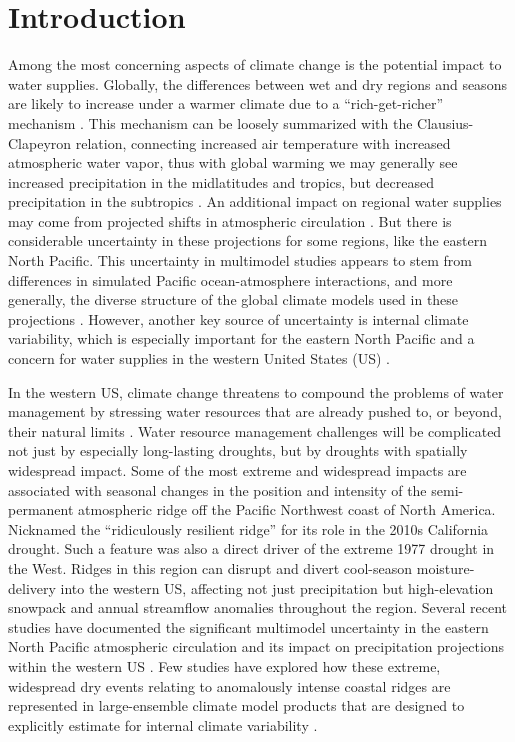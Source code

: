 \documentclass[final, double]{ua-thesis}
\begin{document}
\section{Introduction}


Among the most concerning aspects of climate change is the potential impact to water supplies. Globally, the differences between wet and dry regions and seasons are likely to increase under a warmer climate due to a ``rich-get-richer'' mechanism \citep{3ipcc_climate_2013}. This mechanism can be loosely summarized with the Clausius-Clapeyron relation, connecting increased air temperature with increased atmospheric water vapor, thus with global warming we may generally see increased precipitation in the midlatitudes and tropics, but decreased precipitation in the subtropics \citep{3manabe_effects_1975, 3held_robust_2006}. An additional impact on regional water supplies may come from projected shifts in atmospheric circulation \citep{3lu_expansion_2007, 3scheff_twenty-first-century_2012}. But there is considerable uncertainty in these projections for some regions, like the eastern North Pacific. This uncertainty in multimodel studies appears to stem from differences in simulated Pacific ocean-atmosphere interactions, and more generally, the diverse structure of the global climate models used in these projections \citep[e.g., ][]{3langenbrunner_patterns_2015, 3choi_uncertainty_2016, 3reclamation_bureau_of_reclamation_west-wide_2016}. However, another key source of uncertainty is internal climate variability, which is especially important for the eastern North Pacific and a concern for water supplies in the western United States (US) \citep{3reclamation_bureau_of_reclamation_west-wide_2016}.

In the western US, climate change threatens to compound the problems of water management by stressing water resources that are already pushed to, or beyond, their natural limits \citep{3dettinger_western_2015}. Water resource management challenges will be complicated not just by especially long-lasting droughts, but by droughts with spatially widespread impact. Some of the most extreme and widespread impacts are associated with seasonal changes in the position and intensity of the semi-permanent atmospheric ridge off the Pacific Northwest coast of North America. Nicknamed the ``ridiculously resilient ridge'' for its role in the 2010s California drought. Such a feature was also a direct driver of the extreme 1977 drought in the West. Ridges in this region can disrupt and divert cool-season moisture-delivery into the western US, affecting not just precipitation but high-elevation snowpack and annual streamflow anomalies throughout the region. Several recent studies have documented the significant multimodel uncertainty in the eastern North Pacific atmospheric circulation and its impact on precipitation projections within the western US \citep[e.g., ][]{3langenbrunner_patterns_2015, 3choi_uncertainty_2016}. Few studies have explored how these extreme, widespread dry events relating to anomalously intense coastal ridges are represented in large-ensemble climate model products that are designed to explicitly estimate for internal climate variability \citep[e.g., ][]{3kay_community_2014}.
\end{document}
